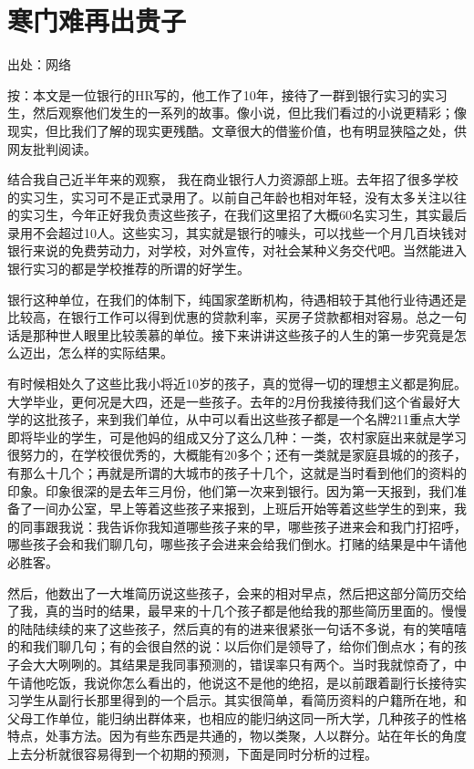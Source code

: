 \chapter{寒门难再出贵子}

\begin{center}
\end{center}


出处：网络

\vspace{10pt}


按：本文是一位银行的HR写的，他工作了10年，接待了一群到银行实习的实习生，然后观察他们发生的一系列的故事。像小说，但比我们看过的小说更精彩；像现实，但比我们了解的现实更残酷。文章很大的借鉴价值，也有明显狭隘之处，供网友批判阅读。

\vspace{10pt}
结合我自己近半年来的观察， 我在商业银行人力资源部上班。去年招了很多学校的实习生，实习可不是正式录用了。以前自己年龄也相对年轻，没有太多关注以往的实习生，今年正好我负责这些孩子，在我们这里招了大概60名实习生，其实最后录用不会超过10人。这些实习，其实就是银行的噱头，可以找些一个月几百块钱对银行来说的免费劳动力，对学校，对外宣传，对社会某种义务交代吧。当然能进入银行实习的都是学校推荐的所谓的好学生。

银行这种单位，在我们的体制下，纯国家垄断机构，待遇相较于其他行业待遇还是比较高，在银行工作可以得到优惠的贷款利率，买房子贷款都相对容易。总之一句话是那种世人眼里比较羡慕的单位。接下来讲讲这些孩子的人生的第一步究竟是怎么迈出，怎么样的实际结果。

有时候相处久了这些比我小将近10岁的孩子，真的觉得一切的理想主义都是狗屁。大学毕业，更何况是大四，还是一些孩子。去年的2月份我接待我们这个省最好大学的这批孩子，来到我们单位，从中可以看出这些孩子都是一个名牌211重点大学即将毕业的学生，可是他妈的组成又分了这么几种：一类，农村家庭出来就是学习很努力的，在学校很优秀的，大概能有20多个；还有一类就是家庭县城的的孩子，有那么十几个；再就是所谓的大城市的孩子十几个，这就是当时看到他们的资料的印象。印象很深的是去年三月份，他们第一次来到银行。因为第一天报到，我们准备了一间办公室，早上等着这些孩子来报到，上班后开始等着这些学生的到来，我的同事跟我说：我告诉你我知道哪些孩子来的早，哪些孩子进来会和我门打招呼，哪些孩子会和我们聊几句，哪些孩子会进来会给我们倒水。打赌的结果是中午请他必胜客。

然后，他数出了一大堆简历说这些孩子，会来的相对早点，然后把这部分简历交给了我，真的当时的结果，最早来的十几个孩子都是他给我的那些简历里面的。慢慢的陆陆续续的来了这些孩子，然后真的有的进来很紧张一句话不多说，有的笑嘻嘻的和我们聊几句；有的会很自然的说：以后你们是领导了，给你们倒点水；有的孩子会大大咧咧的。其结果是我同事预测的，错误率只有两个。当时我就惊奇了，中午请他吃饭，我说你怎么看出的，他说这不是他的绝招，是以前跟着副行长接待实习学生从副行长那里得到的一个启示。其实很简单，看简历资料的户籍所在地，和父母工作单位，能归纳出群体来，也相应的能归纳这同一所大学，几种孩子的性格特点，处事方法。因为有些东西是共通的，物以类聚，人以群分。站在年长的角度上去分析就很容易得到一个初期的预测，下面是同时分析的过程。

